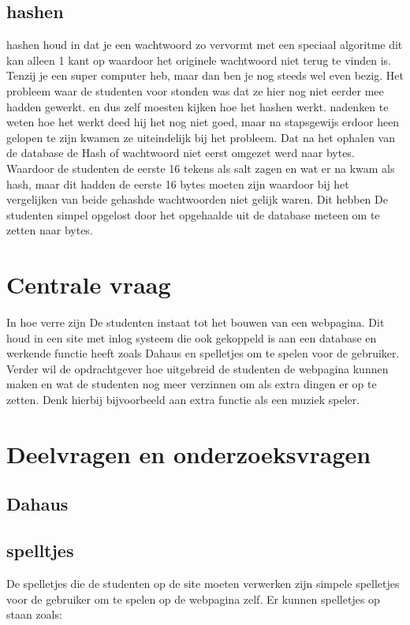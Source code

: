 \documentclass[11pt]{article}
\begin{document}
	\subsection{hashen}
	hashen houd in dat je een wachtwoord zo vervormt met een speciaal algoritme dit kan alleen 1 kant op waardoor het originele wachtwoord niet terug te vinden is. Tenzij je een super computer heb, maar dan ben je nog steeds wel even bezig. Het probleem waar de studenten voor stonden was dat ze hier nog niet eerder mee hadden gewerkt. en dus zelf moesten kijken	hoe het hashen werkt. nadenken te weten hoe het werkt deed hij het nog niet goed, maar na stapsgewijs erdoor heen gelopen te zijn kwamen ze uiteindelijk bij het probleem. Dat na het ophalen van de database de Hash of wachtwoord niet eerst omgezet werd naar bytes. Waardoor de studenten de eerste 16 tekens als salt zagen en wat er na kwam als hash, maar dit hadden de eerste 16 bytes moeten zijn waardoor bij het vergelijken van beide gehashde wachtwoorden niet gelijk waren. Dit hebben De studenten simpel opgelost door het opgehaalde uit de database meteen om te zetten naar bytes.
	
	\newpage
	
	\section{Centrale vraag}
	In hoe verre zijn De studenten instaat tot het bouwen van een webpagina. Dit houd in een site met inlog systeem die ook gekoppeld is aan een database en werkende functie heeft zoals Dahaus en spelletjes om te spelen voor de gebruiker. Verder wil de opdrachtgever hoe uitgebreid de studenten de webpagina kunnen maken en wat de studenten nog meer verzinnen om als extra dingen er op te zetten. Denk hierbij bijvoorbeeld aan extra functie als een muziek speler. 
	
	\newpage
	
	\section{Deelvragen en onderzoeksvragen}
	\subsection{Dahaus}
	\subsection{spelltjes}
	De spelletjes die de studenten op de site moeten verwerken zijn simpele spelletjes voor de gebruiker om te spelen op de webpagina zelf. Er kunnen spelletjes op staan zoals: 
\end{document}
